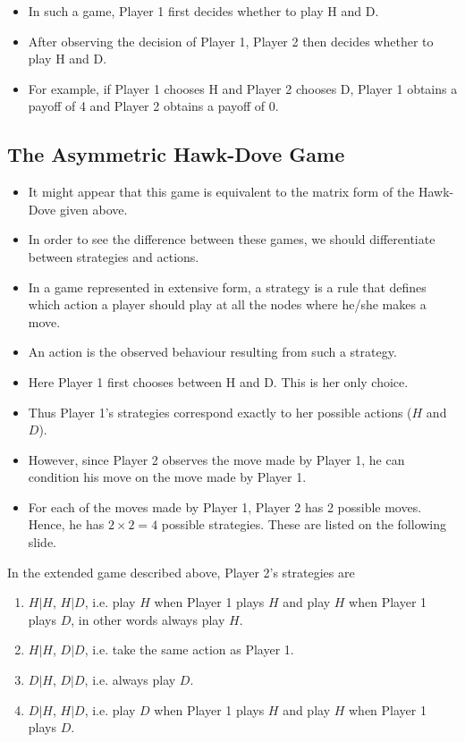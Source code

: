 \documentclass[]{report}
\begin{document}
\begin{itemize}
	\item In such a game, Player 1 first decides whether to play H and D.
	\item After observing the decision of Player 1, Player 2 then decides
	whether to play H and D.
	\item For example, if Player 1 chooses H and Player 2 chooses D, Player
	1 obtains a payoff of 4 and Player 2 obtains a payoff of 0.
\end{itemize}


\subsection{The Asymmetric Hawk-Dove Game}

\begin{itemize}
\item It might appear that this game is equivalent to the matrix form of
	the Hawk-Dove given above.
\item In order to see the difference between these games, we should
	differentiate between strategies and actions.
\item In a game represented in extensive form, a strategy is a rule that
	defines which action a player should play at all the nodes where
	he/she makes a move.
\item An action is the observed behaviour resulting from such a strategy.
\end{itemize}


\begin{itemize}
	\item Here Player 1 first chooses between H and D. This is her only
	choice. 
	\item Thus Player 1’s strategies correspond exactly to her
	possible actions ($H$ and $D$).
	\item However, since Player 2 observes the move made by Player 1, he
	can condition his move on the move made by Player 1.
	\item For each of the moves made by Player 1, Player 2 has 2 possible
	moves. Hence, he has $2 \times 2 = 4$ possible strategies. These are
	listed on the following slide.
\end{itemize}

In the extended game described above, Player 2’s strategies are
\begin{enumerate}
	\item  $H|H$, $H|D$, i.e. play $H$ when Player 1 plays $H$ and
	play $H$ when Player 1 plays $D$, in other words always
	play $H$.
	\item  $H|H$, $D|D$, i.e. take the same action as Player 1.
	\item  $D|H$, $D|D$, i.e. always play $D$.
	\item  $D|H$, $H|D$, i.e. play $D$ when Player 1 plays $H$ and
	play $H$ when Player 1 plays $D$.
\end{enumerate}
\end{document}
